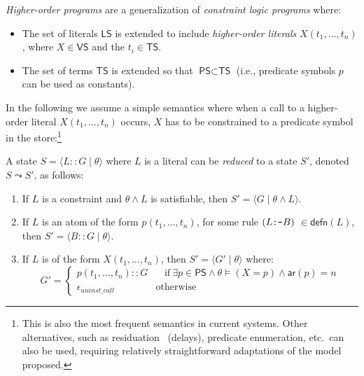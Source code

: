 \documentclass{llncs}
\newcommand{\VS}{\textsf{VS}}
\newcommand{\PS}{\textsf{PS}}
\newcommand{\TS}{\textsf{TS}}
\newcommand{\LS}{\textsf{LS}}
\newcommand{\ar}[1]{\ensuremath{\textsf{ar}(#1)}}
\newcommand{\gd}[0]{\mid}
\newcommand{\state}[2]
  {\ensuremath{\langle #1 \gd{} #2 \rangle}}
\newcommand{\defn}[1]
  {\ensuremath{\textsf{defn}(#1)}}
\newcommand{\reduction}[2]
  {\ensuremath{#1 \leadsto #2}}
\begin{document}
\begin{definition}
\emph{Higher-order programs} are a generalization of
  \emph{constraint logic programs} where:
  \begin{itemize}
  \item The set of literals $\LS$ is extended to include
    \emph{higher-order literals} $X(t_1,\ldots,t_n)$, where $X \in
    \VS$ and the $t_i \in \TS$.
  \item The set of terms $\TS$ is extended so that $\PS \subset \TS$
    (i.e., predicate symbols $p$ can be used as constants).
  \end{itemize}
\end{definition}
In the following we assume a simple semantics where when a call to a
higher-order literal $X(t_1,\ldots,t_n)$ occurs, $X$ has to be
constrained to a predicate symbol in the store:\footnote{This is also
  the most frequent semantics in current systems. Other alternatives,
  such as residuation~\cite{HASSAN93} (delays), predicate enumeration,
  etc.\ can also be used, requiring relatively straightforward
  adaptations of the model proposed.}

\begin{definition}
  \label{def:ho-reductions}
  A state $S = \state{L::G}{\theta}$ where $L$ is a literal can be
  \emph{reduced} to a state $S'$, denoted $\reduction{S}{S'}$, as
  follows:
  \begin{enumerate}
  \item 
    If $L$ is a constraint and $\theta \land L$ is satisfiable,
    then $S' = \state{G}{\theta \land L}$.
  \item 
    If $L$ is an atom of the form $p(t_1,\ldots,t_n)$, for some
    rule $(L \mbox{\tt :-} B)$ $\in \defn{L}$, then $S' =
    \state{B::G}{\theta}$.
  \item If $L$ is of the form $X(t_1,\ldots,t_n)$, then 
    $S' = \state{G'}{\theta}$ where:
    \[
    G' = \left\{
      \begin{array}{lr}
        p(t_1,\ldots,t_n) :: G  
      & ~~~~\textrm{if}~ \exists p \in \PS \wedge \theta \models 
        (X = p) \wedge \ar{p} = n 
      \\
        \epsilon_{uninst\_call} 
      & \textrm{otherwise}
      \end{array}
      \right.
    \]
  \end{enumerate}
\end{definition}
\end{document}
